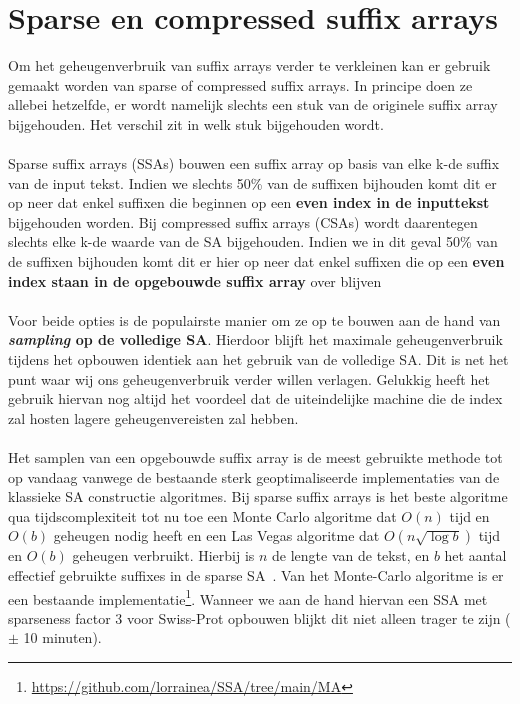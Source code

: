 \section{Sparse en compressed suffix arrays}\label{sec:sparse-en-compressed-suffix-arrays}
Om het geheugenverbruik van suffix arrays verder te verkleinen kan er gebruik gemaakt worden van sparse of compressed suffix arrays.
In principe doen ze allebei hetzelfde, er wordt namelijk slechts een stuk van de originele suffix array bijgehouden.
Het verschil zit in welk stuk bijgehouden wordt.
\\ \\
Sparse suffix arrays (SSAs) bouwen een suffix array op basis van elke k-de suffix van de input tekst.
Indien we slechts 50\% van de suffixen bijhouden komt dit er op neer dat enkel suffixen die beginnen op een \textbf{even index in de inputtekst} bijgehouden worden.
Bij compressed suffix arrays (CSAs) wordt daarentegen slechts elke k-de waarde van de SA bijgehouden.
Indien we in dit geval 50\% van de suffixen bijhouden komt dit er hier op neer dat enkel suffixen die op een \textbf{even index staan in de opgebouwde suffix array} over blijven
\\ \\
Voor beide opties is de populairste manier om ze op te bouwen aan de hand van \textbf{\textit{sampling} op de volledige SA\@}.
Hierdoor blijft het maximale geheugenverbruik tijdens het opbouwen identiek aan het gebruik van de volledige SA\@.
Dit is net het punt waar wij ons geheugenverbruik verder willen verlagen.
Gelukkig heeft het gebruik hiervan nog altijd het voordeel dat de uiteindelijke machine die de index zal hosten lagere geheugenvereisten zal hebben.
\\ \\
Het samplen van een opgebouwde suffix array is de meest gebruikte methode tot op vandaag vanwege de bestaande sterk geoptimaliseerde implementaties van de klassieke SA constructie algoritmes.
Bij sparse suffix arrays is het beste algoritme qua tijdscomplexiteit tot nu toe een Monte Carlo algoritme dat $O(n)$ tijd en $O(b)$ geheugen nodig heeft en een Las Vegas algoritme dat $O(n \sqrt{\log b})$ tijd en $O(b)$ geheugen verbruikt.
Hierbij is $n$ de lengte van de tekst, en $b$ het aantal effectief gebruikte suffixes in de sparse SA~\cite{building_sparse_sa}.
Van het Monte-Carlo algoritme is er een bestaande implementatie\footnote{\url{https://github.com/lorrainea/SSA/tree/main/MA}}.
Wanneer we aan de hand hiervan een SSA met sparseness factor 3 voor Swiss-Prot opbouwen blijkt dit niet alleen trager te zijn ($\pm$ 10 minuten).
